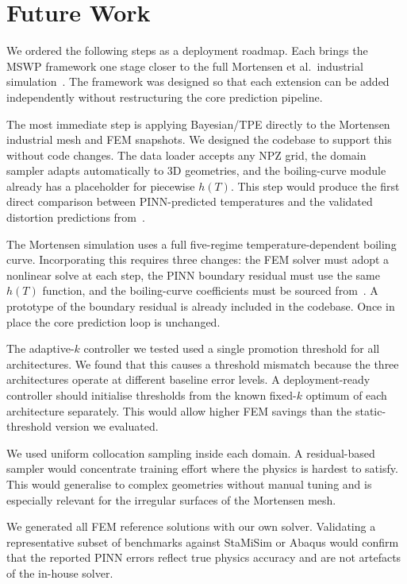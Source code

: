 \section{Future Work}
\label{sec:conc_future}

We ordered the following steps as a deployment roadmap.
Each brings the MSWP framework one stage closer to the full Mortensen et al.\
industrial simulation~\cite{mortensen2026}.
The framework was designed so that each extension can be added independently
without restructuring the core prediction pipeline.

The most immediate step is applying Bayesian/TPE directly to the Mortensen
industrial mesh and FEM snapshots.
We designed the codebase to support this without code changes.
The data loader accepts any NPZ grid, the domain sampler adapts automatically
to 3D geometries, and the boiling-curve module already has a placeholder for
piecewise $h(T)$.
This step would produce the first direct comparison between PINN-predicted
temperatures and the validated distortion predictions from~\cite{mortensen2026}.

The Mortensen simulation uses a full five-regime temperature-dependent boiling
curve.
Incorporating this requires three changes: the FEM solver must adopt a nonlinear
solve at each step, the PINN boundary residual must use the same $h(T)$ function,
and the boiling-curve coefficients must be sourced from~\cite{mortensen2026}.
A prototype of the boundary residual is already included in the codebase.
Once in place the core prediction loop is unchanged.

The adaptive-$k$ controller we tested used a single promotion threshold for all
architectures.
We found that this causes a threshold mismatch because the three architectures
operate at different baseline error levels.
A deployment-ready controller should initialise thresholds from the known
fixed-$k$ optimum of each architecture separately.
This would allow higher FEM savings than the static-threshold version we evaluated.

We used uniform collocation sampling inside each domain.
A residual-based sampler would concentrate training effort where the physics is
hardest to satisfy.
This would generalise to complex geometries without manual tuning and is
especially relevant for the irregular surfaces of the Mortensen mesh.

We generated all FEM reference solutions with our own solver.
Validating a representative subset of benchmarks against StaMiSim or Abaqus
would confirm that the reported PINN errors reflect true physics accuracy and
are not artefacts of the in-house solver.

